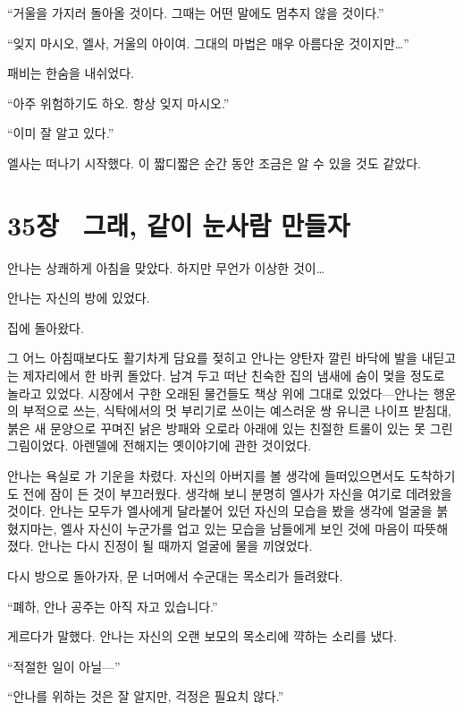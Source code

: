 ``거울을 가지러 돌아올 것이다. 그때는 어떤 말에도 멈추지 않을 것이다.''

``잊지 마시오, 엘사, 거울의 아이여. 그대의 마법은 매우 아름다운 것이지만\ldots''

패비는 한숨을 내쉬었다.

``아주 위험하기도 하오. 항상 잊지 마시오.''

``이미 잘 알고 있다.''

엘사는 떠나기 시작했다. 이 짧디짧은 순간 동안 조금은 알 수 있을 것도 같았다.



\chapter[35장  그래, 같이 눈사람 만들자][35장\hspace*{.5em}그래, 같이 눈사람 만들자]{35장 \ 그래, 같이 눈사람 만들자}



안나는 상쾌하게 아침을 맞았다. 하지만 무언가 이상한 것이\ldots

안나는 자신의 방에 있었다.

집에 돌아왔다.

그 어느 아침때보다도 활기차게 담요를 젖히고 안나는 양탄자 깔린 바닥에 발을 내딛고는 제자리에서 한 바퀴 돌았다. 남겨 두고 떠난 친숙한 집의 냄새에 숨이 멎을 정도로 놀라고 있었다. 시장에서 구한 오래된 물건들도 책상 위에 그대로 있었다—안나는 행운의 부적으로 쓰는, 식탁에서의 멋 부리기로 쓰이는 예스러운 쌍 유니콘 나이프 받침대, 붉은 새 문양으로 꾸며진 낡은 방패와 오로라 아래에 있는 친절한 트롤이 있는 못 그린 그림이었다. 아렌델에 전해지는 옛이야기에 관한 것이었다.

안나는 욕실로 가 기운을 차렸다. 자신의 아버지를 볼 생각에 들떠있으면서도 도착하기도 전에 잠이 든 것이 부끄러웠다. 생각해 보니 분명히 엘사가 자신을 여기로 데려왔을 것이다. 안나는 모두가 엘사에게 달라붙어 있던 자신의 모습을 봤을 생각에 얼굴을 붉혔지마는, 엘사 자신이 누군가를 업고 있는 모습을 남들에게 보인 것에 마음이 따뜻해졌다. 안나는 다시 진정이 될 때까지 얼굴에 물을 끼얹었다.

다시 방으로 돌아가자, 문 너머에서 수군대는 목소리가 들려왔다.

``폐하, 안나 공주는 아직 자고 있습니다.''

게르다가 말했다. 안나는 자신의 오랜 보모의 목소리에 꺅하는 소리를 냈다.

``적절한 일이 아닐—''

``안나를 위하는 것은 잘 알지만, 걱정은 필요치 않다.''

